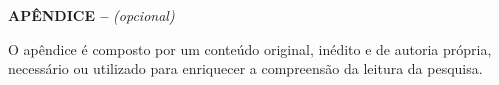     \setlength{\parindent}{1.25cm}
   \singlespacing

\begin{center}

\textbf{APÊNDICE –} \textit{(opcional)}
    
\end{center}

O apêndice é composto por um conteúdo original, inédito e de autoria própria, necessário ou utilizado para enriquecer a compreensão da leitura da pesquisa.
